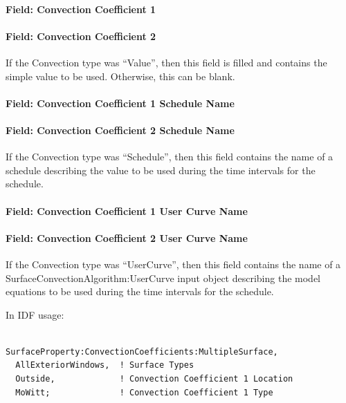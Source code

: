 \paragraph{Field: Convection Coefficient 1}\label{field-convection-coefficient-1-1}

\paragraph{Field: Convection Coefficient 2}\label{field-convection-coefficient-2-1}

If the Convection type was ``Value'', then this field is filled and contains the simple value to be used. Otherwise, this can be blank.

\paragraph{Field: Convection Coefficient 1 Schedule Name}\label{field-convection-coefficient-1-schedule-name-1}

\paragraph{Field: Convection Coefficient 2 Schedule Name}\label{field-convection-coefficient-2-schedule-name-1}

If the Convection type was ``Schedule'', then this field contains the name of a schedule describing the value to be used during the time intervals for the schedule.

\paragraph{Field: Convection Coefficient 1 User Curve Name}\label{field-convection-coefficient-1-user-curve-name-1}

\paragraph{Field: Convection Coefficient 2 User Curve Name}\label{field-convection-coefficient-2-user-curve-name-1}

If the Convection type was ``UserCurve'', then this field contains the name of a SurfaceConvectionAlgorithm:UserCurve input object describing the model equations to be used during the time intervals for the schedule.

In IDF usage:

\begin{lstlisting}

SurfaceProperty:ConvectionCoefficients:MultipleSurface,
  AllExteriorWindows,  ! Surface Types
  Outside,             ! Convection Coefficient 1 Location
  MoWitt;              ! Convection Coefficient 1 Type
\end{lstlisting}

